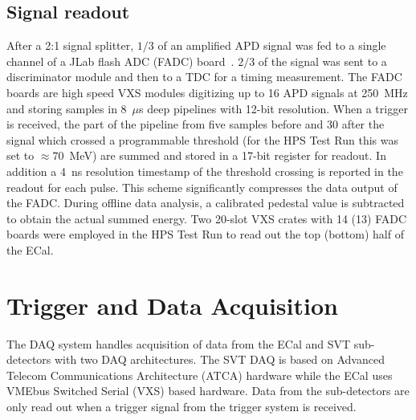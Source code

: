 \documentclass[final,3p,times,twocolumn]{elsarticle}
\begin{document}
\subsection{Signal readout}
\label{sec:fadc}
After a 2:1 signal splitter, $1/3$ of an amplified APD signal was fed to a 
single channel of a JLab flash ADC (FADC) board~\cite{fadc}. $2/3$ of the signal was sent to a 
discriminator module and then to a TDC for a timing measurement. 
The FADC boards are high speed VXS modules digitizing up to 16 APD signals 
at 250~MHz and storing samples in 8~$\mu$s deep pipelines with 12-bit resolution. 
When a trigger is received, the part 
of the pipeline from five samples before and 30 after the signal which crossed a programmable 
threshold (for the HPS Test Run this was set to $\approx70$~MeV) are 
summed and stored in a 17-bit register for readout. In addition a 4~ns resolution timestamp of the 
threshold crossing is reported in the readout for each pulse.
This scheme significantly compresses the data output of the FADC. During offline data analysis, a 
calibrated pedestal value is subtracted to obtain the actual summed energy.
Two 20-slot VXS crates with 14 (13) FADC boards were employed in the HPS Test Run to read out the 
top (bottom) half of the ECal.




\section{Trigger and Data Acquisition}
\label{sec:triggerdaq}

The DAQ system handles acquisition of data from the ECal and SVT sub-detectors  with 
two DAQ architectures. The SVT DAQ is based on Advanced Telecom Communications Architecture 
(ATCA) hardware while the ECal uses VMEbus Switched Serial (VXS) based hardware. Data from the 
sub-detectors are only read out when a trigger signal from the trigger system is received.
\end{document}
